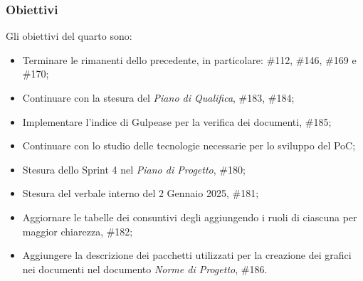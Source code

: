 \subsubsection{Obiettivi}
Gli obiettivi del quarto  sono:
\begin{itemize}
    \item Terminare le  rimanenti dello  precedente, in particolare: \#112, \#146, \#169 e \#170;
    \item Continuare con la stesura del \textit{Piano di Qualifica},  \#183, \#184;
    \item Implementare l'indice di Gulpease per la verifica dei documenti,  \#185;
    \item Continuare con lo studio delle tecnologie necessarie per lo sviluppo del PoC;
    \item Stesura dello Sprint 4 nel \textit{Piano di Progetto},  \#180;
    \item Stesura del verbale interno del 2 Gennaio 2025,  \#181;
    \item Aggiornare le tabelle dei consuntivi degli  aggiungendo i ruoli di ciascuna  per maggior chiarezza,  \#182;
    \item Aggiungere la descrizione dei pacchetti utilizzati per la creazione dei grafici nei documenti nel documento \textit{Norme di Progetto},  \#186.
\end{itemize}
